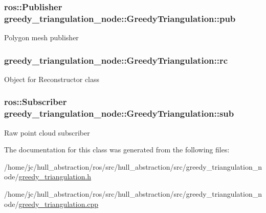 \subsubsection[{\texorpdfstring{pub}{pub}}]{\setlength{\rightskip}{0pt plus 5cm}ros\+::\+Publisher greedy\+\_\+triangulation\+\_\+node\+::\+Greedy\+Triangulation\+::pub\hspace{0.3cm}{\ttfamily [private]}}\hypertarget{classgreedy__triangulation__node_1_1_greedy_triangulation_abca7e84377eaee40cd99f33a1c75146f}{}\label{classgreedy__triangulation__node_1_1_greedy_triangulation_abca7e84377eaee40cd99f33a1c75146f}
Polygon mesh publisher 
\subsubsection[{\texorpdfstring{rc}{rc}}]{ greedy\+\_\+triangulation\+\_\+node\+::\+Greedy\+Triangulation\+::rc\hspace{0.3cm}{\ttfamily [private]}}\hypertarget{classgreedy__triangulation__node_1_1_greedy_triangulation_a7b95cdf57121ac4cdc5e5d8115a7c598}{}\label{classgreedy__triangulation__node_1_1_greedy_triangulation_a7b95cdf57121ac4cdc5e5d8115a7c598}
Object for Reconstructor class 
\subsubsection[{\texorpdfstring{sub}{sub}}]{\setlength{\rightskip}{0pt plus 5cm}ros\+::\+Subscriber greedy\+\_\+triangulation\+\_\+node\+::\+Greedy\+Triangulation\+::sub\hspace{0.3cm}{\ttfamily [private]}}\hypertarget{classgreedy__triangulation__node_1_1_greedy_triangulation_adab5bb6a0e615bbb36ea53d1fa4e279a}{}\label{classgreedy__triangulation__node_1_1_greedy_triangulation_adab5bb6a0e615bbb36ea53d1fa4e279a}
Raw point cloud subscriber 

The documentation for this class was generated from the following files\+:\begin{DoxyCompactItemize}
\item 
/home/jc/hull\+\_\+abstraction/ros/src/hull\+\_\+abstraction/src/greedy\+\_\+triangulation\+\_\+node/\hyperlink{greedy__triangulation_8h}{greedy\+\_\+triangulation.\+h}\item 
/home/jc/hull\+\_\+abstraction/ros/src/hull\+\_\+abstraction/src/greedy\+\_\+triangulation\+\_\+node/\hyperlink{greedy__triangulation_8cpp}{greedy\+\_\+triangulation.\+cpp}\end{DoxyCompactItemize}
